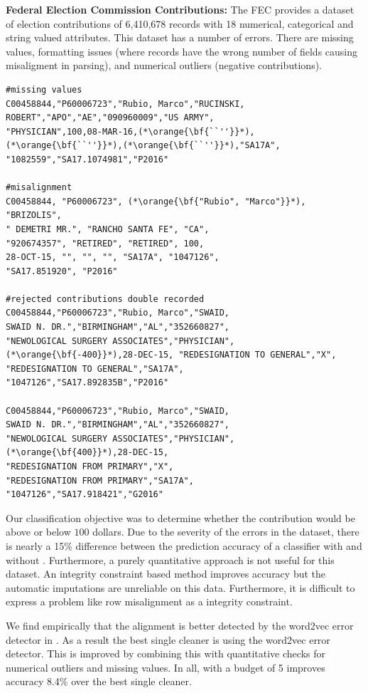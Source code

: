 \vspace{0.5em}\noindent\textbf{Federal Election Commission Contributions: } The FEC provides a dataset of election contributions of 6,410,678 records with 18 numerical, categorical and string valued attributes. This dataset has a number of errors. There are missing values, formatting issues (where records have the wrong number of fields causing misaligment in parsing), and numerical outliers (negative contributions).

\begin{lstlisting}
#missing values
C00458844,"P60006723","Rubio, Marco","RUCINSKI,
ROBERT","APO","AE","090960009","US ARMY",
"PHYSICIAN",100,08-MAR-16,(*\orange{\bf{``''}}*),(*\orange{\bf{``''}}*),(*\orange{\bf{``''}}*),"SA17A",
"1082559","SA17.1074981","P2016"

#misalignment
C00458844, "P60006723", (*\orange{\bf{"Rubio", "Marco"}}*), "BRIZOLIS",
" DEMETRI MR.", "RANCHO SANTA FE", "CA", 
"920674357", "RETIRED", "RETIRED", 100, 
28-OCT-15, "", "", "", "SA17A", "1047126", 
"SA17.851920", "P2016"

#rejected contributions double recorded
C00458844,"P60006723","Rubio, Marco","SWAID, 
SWAID N. DR.","BIRMINGHAM","AL","352660827",
"NEWOLOGICAL SURGERY ASSOCIATES","PHYSICIAN",
(*\orange{\bf{-400}}*),28-DEC-15, "REDESIGNATION TO GENERAL","X",
"REDESIGNATION TO GENERAL","SA17A",
"1047126","SA17.892835B","P2016"

C00458844,"P60006723","Rubio, Marco","SWAID, 
SWAID N. DR.","BIRMINGHAM","AL","352660827",
"NEWOLOGICAL SURGERY ASSOCIATES","PHYSICIAN",
(*\orange{\bf{400}}*),28-DEC-15, 
"REDESIGNATION FROM PRIMARY","X", 
"REDESIGNATION FROM PRIMARY","SA17A",
"1047126","SA17.918421","G2016"
\end{lstlisting}

Our classification objective was to determine whether the contribution would be above or below $100$ dollars. Due to the severity of the errors in the dataset, there is nearly a 15\% difference between the prediction accuracy of a classifier with and without \sys.
Furthermore, a purely quantitative approach is not useful for this dataset.
An integrity constraint based method improves accuracy but the automatic imputations are unreliable on this data.
Furthermore, it is difficult to express a problem like row misalignment as a integrity constraint.

We find empirically that the alignment is better detected by the word2vec error detector in \sys.
As a result the best single cleaner is using the word2vec error detector.
This is improved by combining this with quantitative checks for numerical outliers and missing values.
In all, \sys with a budget of 5 improves accuracy 8.4\% over the best single cleaner. 

